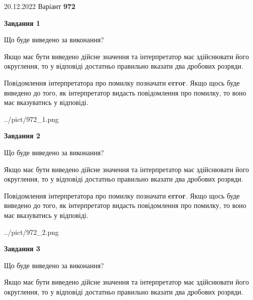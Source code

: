 \documentclass[12pt, ukrainian]{article}
\begin{document}
{20.12.2022 Варіант \No \textbf { 972 }\par}
{
\begin {Large}

{\begin {center}\textbf{Завдання 1}\end {center}}\par
Що буде виведено за виконання? \par

Якщо має бути виведено дійсне значення та інтерпретатор має здійснювати його округлення, 
то у відповіді достатньо правильно вказати два дробових розряди.

Повідомлення інтерпретатора про помилку позначати \textbf{error}.
Якщо щось буде виведено до того, як інтерпретатор видасть повідомлення про помилку, 
то воно має вказуватись у відповіді. \par

\begin{center}
	{../pict/972_1.png}
\end{center}
\newpage

{\begin {center}\textbf{Завдання 2}\end {center}}\par
Що буде виведено за виконання? \par

Якщо має бути виведено дійсне значення та інтерпретатор має здійснювати його округлення, 
то у відповіді достатньо правильно вказати два дробових розряди.

Повідомлення інтерпретатора про помилку позначати \textbf{error}.
Якщо щось буде виведено до того, як інтерпретатор видасть повідомлення про помилку, 
то воно має вказуватись у відповіді. \par

\begin{center}
	{../pict/972_2.png}
\end{center}
\newpage

{\begin {center}\textbf{Завдання 3}\end {center}}\par
Що буде виведено за виконання? \par

Якщо має бути виведено дійсне значення та інтерпретатор має здійснювати його округлення, 
то у відповіді достатньо правильно вказати два дробових розряди.


\end{Large}}
\end{document}
